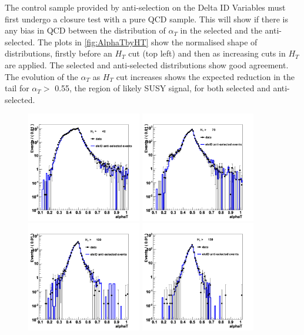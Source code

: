 The control sample provided by anti-selection on the Delta ID Variables must first undergo a closure test with a pure QCD sample. This will show if there is any bias in QCD between the distribution of $\alpha_{T}$ in the selected and the anti-selected. The plots in \ref{fig:AlphaTbyHT} show the normalised shape of distributions, firstly before an $H_{T}$ cut (top left) and then as increasing cuts in $H_{T}$ are applied. The selected and anti-selected distributions show good agreement. The evolution of the $\alpha_{T}$ as $H_{T}$ cut increases shows the expected reduction in the tail for $\alpha_{T} >$ 0.55, the region of likely SUSY signal, for both selected and anti-selected.

\begin{figure}[h!]
\includegraphics[width=50mm]{Plots/mc-alphaT-1}
\includegraphics[width=50mm]{Plots/mc-alphaT-2}
\includegraphics[width=50mm]{Plots/mc-alphaT-3}
\includegraphics[width=50mm]{Plots/mc-alphaT-4}

\end{figure}
